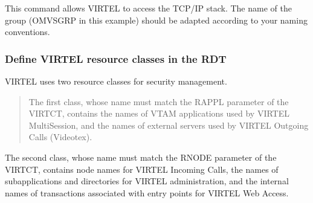 \documentclass[letterpaper,10pt,english]{sphinxmanual}
\begin{document}
\sphinxAtStartPar
This command allows VIRTEL to access the TCP/IP stack. The name of the group (OMVSGRP in this example) should be adapted according to your naming conventions.


\subsubsection{Define VIRTEL resource classes in the RDT}
\label{\detokenize{Installation_Guide:define-virtel-resource-classes-in-the-rdt}}
\begin{sphinxVerbatim}[commandchars=\\\{\}]
  
  
\end{sphinxVerbatim}

\sphinxAtStartPar
{}

\sphinxAtStartPar
VIRTEL uses two resource classes for security management.
\begin{quote}

\sphinxAtStartPar
The first class, whose name must match the RAPPL parameter of the VIRTCT, contains the names of VTAM applications used by VIRTEL Multi\sphinxhyphen{}Session, and the names of external servers used by VIRTEL Outgoing Calls (Videotex).
\end{quote}

\sphinxAtStartPar
The second class, whose name must match the RNODE parameter of the  VIRTCT, contains node names for VIRTEL Incoming Calls, the names of sub\sphinxhyphen{}applications and directories for VIRTEL administration, and the internal names of transactions associated with entry points for VIRTEL Web Access.
\end{document}
